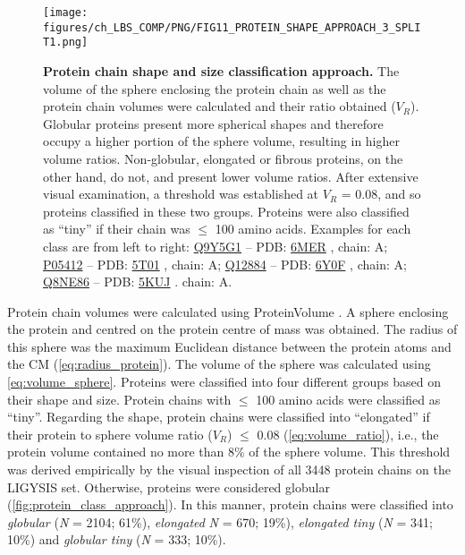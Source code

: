 \begin{figure}[htb!]
    \centering
    \texttt{[image: figures/ch\_LBS\_COMP/PNG/FIG11\_PROTEIN\_SHAPE\_APPROACH\_3\_SPLIT1.png]}
    \caption[Protein chain shape and size classification approach]{\textbf{Protein chain shape and size classification approach.} The volume of the sphere enclosing the protein chain as well as the protein chain volumes were calculated and their ratio obtained ($V_R$). Globular proteins present more spherical shapes and therefore occupy a higher portion of the sphere volume, resulting in higher volume ratios. Non-globular, elongated or fibrous proteins, on the other hand, do not, and present lower volume ratios. After extensive visual examination, a threshold was established at $V_R$ = 0.08, and so proteins classified in these two groups. Proteins were also classified as ``tiny'' if their chain was $\leq$ 100 amino acids. Examples for each class are from left to right: \href{https://www.uniprot.org/uniprotkb/Q9Y5G1/entry}{Q9Y5G1} -- PDB: \href{https://www.ebi.ac.uk/pdbe/entry/pdb/6mer}{6MER} \cite{NICLOLUDIS_2019_CADH}, chain: A; \href{https://www.uniprot.org/uniprotkb/P05412/entry}{P05412} -- PDB: \href{https://www.ebi.ac.uk/pdbe/entry/pdb/5t01}{5T01} \cite{HONG_2017_EPSTEINBARR}, chain: A; \href{https://www.uniprot.org/uniprotkb/Q12884/entry}{Q12884} -- PDB: \href{https://www.ebi.ac.uk/pdbe/entry/pdb/6Y0F}{6Y0F} \cite{PDB_6Y0F}, chain: A; \href{https://www.uniprot.org/uniprotkb/Q8NE86/entry}{Q8NE86} -- PDB: \href{https://www.ebi.ac.uk/pdbe/entry/pdb/5KUJ}{5KUJ} \cite{LEE_2016_CALCIUM}. chain: A.}
    \label{fig:protein_class_approach}
\end{figure}

Protein chain volumes were calculated using ProteinVolume \cite{CHEN_2015_PROTEINVOLUME}. A sphere enclosing the protein and centred on the protein centre of mass was obtained. The radius of this sphere was the maximum Euclidean distance \cite{300BC_EUCLID_ELEMENTS} between the protein atoms and the CM (\autoref{eq:radius_protein}). The volume of the sphere was calculated using \autoref{eq:volume_sphere}. Proteins were classified into four different groups based on their shape and size. Protein chains with $\leq$ 100 amino acids were classified as ``tiny''. Regarding the shape, protein chains were classified into ``elongated'' if their protein to sphere volume ratio ($V_R$) $\leq$ 0.08 (\autoref{eq:volume_ratio}), i.e., the protein volume contained no more than 8\% of the sphere volume. This threshold was derived empirically by the visual inspection of all 3448 protein chains on the LIGYSIS set. Otherwise, proteins were considered globular (\autoref{fig:protein_class_approach}). In this manner, protein chains were classified into \textit{globular} (\textit{N} = 2104; 61\%), \textit{elongated} \textit{N} = 670; 19\%), \textit{elongated tiny} (\textit{N} = 341; 10\%) and \textit{globular tiny} (\textit{N} = 333; 10\%).

